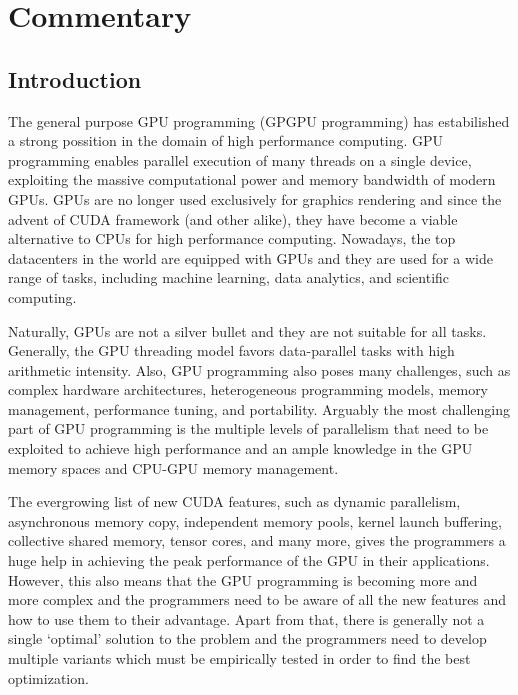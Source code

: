 \documentclass[12pt,a4paper]{report}
\begin{document}



\tableofcontents



\part{Commentary}

\chapter{Introduction}

The general purpose GPU programming (GPGPU programming) has estabilished a strong possition in the domain of high performance computing. 
GPU programming enables parallel execution of many threads on a single device, exploiting the massive computational power and memory bandwidth of modern GPUs. 
GPUs are no longer used exclusively for graphics rendering and since the advent of CUDA framework (and other alike), they have become a viable alternative to CPUs for high performance computing.
Nowadays, the top datacenters in the world are equipped with GPUs and they are used for a wide range of tasks, including machine learning, data analytics, and scientific computing.

Naturally, GPUs are not a silver bullet and they are not suitable for all tasks. Generally, the GPU threading model favors data-parallel tasks with high arithmetic intensity.
Also, GPU programming also poses many challenges, such as complex hardware architectures, heterogeneous programming models, memory management, performance tuning, and portability.
Arguably the most challenging part of GPU programming is the multiple levels of parallelism that need to be exploited to achieve high performance and an ample knowledge in the GPU memory spaces and CPU-GPU memory management.

The evergrowing list of new CUDA features, such as dynamic parallelism, asynchronous memory copy, independent memory pools, kernel launch buffering, collective shared memory, tensor cores, and many more, gives the programmers a huge help in achieving the peak performance of the GPU in their applications.
However, this also means that the GPU programming is becoming more and more complex and the programmers need to be aware of all the new features and how to use them to their advantage.
Apart from that, there is generally not a single `optimal' solution to the problem and the programmers need to develop multiple variants which must be empirically tested in order to find the best optimization.
\end{document}
